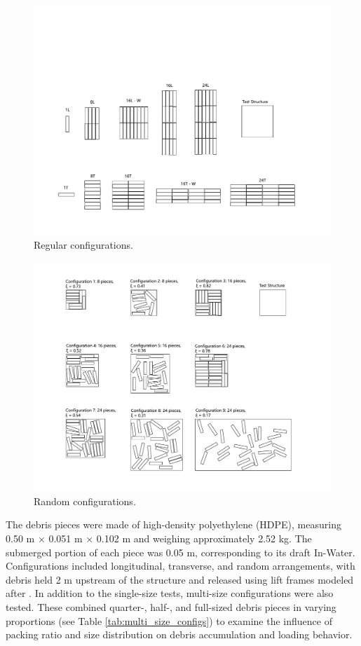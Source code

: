 \documentclass{article}
\begin{document}
{\begin{figure}[htbp]
    \centering
    \includegraphics[width=1.4\textwidth]{Configurations.pdf}
    \caption{Regular configurations.}
    \label{fig:configurations}
\end{figure}


\begin{figure}[htbp]
    \centering
    \includegraphics[width=1.5\textwidth]{configurations_rand.pdf}
    \caption{Random configurations.}
    \label{fig:configurations_random}
\end{figure}

The debris pieces were made of high-density polyethylene (HDPE), measuring 0.50 m × 0.051 m × 0.102 m and weighing approximately 2.52 kg. The submerged portion of each piece was 0.05 m, corresponding to its draft In-Water. Configurations included longitudinal, transverse, and random arrangements, with debris held 2 m upstream of the structure and released using lift frames modeled after \citet{Shekhar2020}. In addition to the single-size tests, multi-size configurations were also tested. These combined quarter-, half-, and full-sized debris pieces in varying proportions (see Table \ref{tab:multi_size_configs}) to examine the influence of packing ratio and size distribution on debris accumulation and loading behavior. 


}
\end{document}
